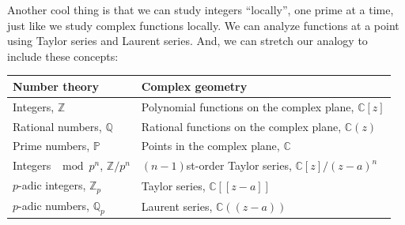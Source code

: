 \documentclass{article}
\begin{document}
Another cool thing is that we can study integers ``locally'', one prime
at a time, just like we study complex functions locally. We can analyze
functions at a point using Taylor series and Laurent series. And, we can
stretch our analogy to include these concepts:

\begin{longtable}[]{@{}ll@{}}
\toprule
\begin{minipage}[b]{0.42\columnwidth}\raggedright
Number theory\strut
\end{minipage} & \begin{minipage}[b]{0.52\columnwidth}\raggedright
Complex geometry\strut
\end{minipage}\tabularnewline
\midrule
\endhead
\begin{minipage}[t]{0.42\columnwidth}\raggedright
Integers, \(\mathbb{Z}\)\strut
\end{minipage} & \begin{minipage}[t]{0.52\columnwidth}\raggedright
Polynomial functions on the complex plane, \(\mathbb{C}[z]\)\strut
\end{minipage}\tabularnewline
\begin{minipage}[t]{0.42\columnwidth}\raggedright
Rational numbers, \(\mathbb{Q}\)\strut
\end{minipage} & \begin{minipage}[t]{0.52\columnwidth}\raggedright
Rational functions on the complex plane, \(\mathbb{C}(z)\)\strut
\end{minipage}\tabularnewline
\begin{minipage}[t]{0.42\columnwidth}\raggedright
Prime numbers, \(\mathbb{P}\)\strut
\end{minipage} & \begin{minipage}[t]{0.52\columnwidth}\raggedright
Points in the complex plane, \(\mathbb{C}\)\strut
\end{minipage}\tabularnewline
\begin{minipage}[t]{0.42\columnwidth}\raggedright
Integers \(\mod p^n\), \(\mathbb{Z}/p^n\)\strut
\end{minipage} & \begin{minipage}[t]{0.52\columnwidth}\raggedright
\((n-1)\)st-order Taylor series, \(\mathbb{C}[z]/(z-a)^n\)\strut
\end{minipage}\tabularnewline
\begin{minipage}[t]{0.42\columnwidth}\raggedright
\(p\)-adic integers, \(\mathbb{Z}_p\)\strut
\end{minipage} & \begin{minipage}[t]{0.52\columnwidth}\raggedright
Taylor series, \(\mathbb{C}[[z-a]]\)\strut
\end{minipage}\tabularnewline
\begin{minipage}[t]{0.42\columnwidth}\raggedright
\(p\)-adic numbers, \(\mathbb{Q}_p\)\strut
\end{minipage} & \begin{minipage}[t]{0.52\columnwidth}\raggedright
Laurent series, \(\mathbb{C}((z-a))\)\strut
\end{minipage}\tabularnewline
\bottomrule
\end{longtable}
\end{document}
